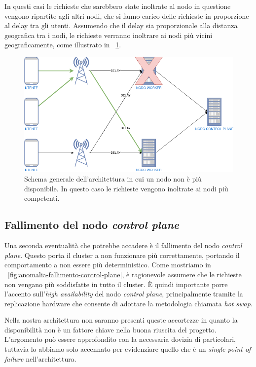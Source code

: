 \documentclass[12pt, hidelinks]{report}
\begin{document}
In questi casi le richieste che sarebbero state inoltrate al nodo in questione vengono ripartite agli altri nodi, che si fanno carico delle richieste in proporzione al delay tra gli utenti. Assumendo che il delay sia proporzionale alla distanza geografica tra i nodi, le richieste verranno inoltrare ai nodi più vicini geograficamente, come illustrato in \figurename~\ref{fig:anomalia-fallimento-di-un-nodo}.

\begin{figure}[H]
    \centering
    \includegraphics[width=\linewidth]{10_anomalia-fallimento-di-un-nodo.png}
    \caption{Schema generale dell'architettura in cui un nodo non è più disponibile. In questo caso le richieste vengono inoltrate ai nodi più competenti.}
    \label{fig:anomalia-fallimento-di-un-nodo}
\end{figure}

\subsection{Fallimento del nodo \textit{control plane}}
Una seconda eventualità che potrebbe accadere è il fallimento del nodo \textit{control plane}. Questo porta il cluster a non funzionare più correttamente, portando il comportamento a non essere più deterministico. Come mostriamo in \figurename~\ref{fig:anomalia-fallimento-control-plane}, è ragionevole assumere che le richieste non vengano più soddisfatte in tutto il cluster. È quindi importante porre l'accento sull'\textit{high availability} del nodo \textit{control plane}, principalmente tramite la replicazione hardware che consente di adottare la metodologia chiamata \textit{hot swap}.

Nella nostra architettura non saranno presenti queste accortezze in quanto la disponibilità non è un fattore chiave nella buona riuscita del progetto. L'argomento può essere approfondito con la necessaria dovizia di particolari, tuttavia lo abbiamo solo accennato per evidenziare quello che è un \textit{single point of failure} nell'architettura.
\end{document}
